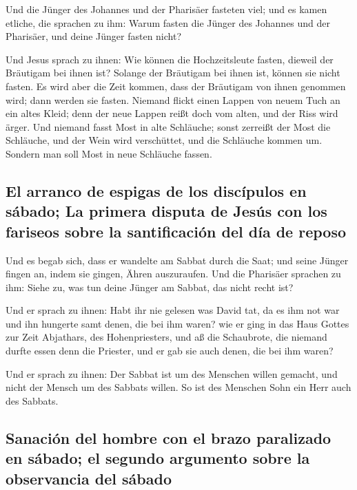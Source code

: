  Und die Jünger des Johannes und der Pharisäer fasteten
viel; und es kamen etliche, die sprachen zu ihm: Warum fasten die Jünger
des Johannes und der Pharisäer, und deine Jünger fasten nicht?

 Und Jesus sprach zu ihnen: Wie können die Hochzeitsleute
fasten, dieweil der Bräutigam bei ihnen ist? Solange der Bräutigam bei
ihnen ist, können sie nicht fasten.  Es wird aber die
Zeit kommen, dass der Bräutigam von ihnen genommen wird; dann werden sie
fasten.  Niemand flickt einen Lappen von neuem Tuch an
ein altes Kleid; denn der neue Lappen reißt doch vom alten, und der Riss
wird ärger.  Und niemand fasst Most in alte Schläuche;
sonst zerreißt der Most die Schläuche, und der Wein wird verschüttet,
und die Schläuche kommen um. Sondern man soll Most in neue Schläuche
fassen.

\hypertarget{el-arranco-de-espigas-de-los-discuxedpulos-en-suxe1bado-la-primera-disputa-de-jesuxfas-con-los-fariseos-sobre-la-santificaciuxf3n-del-duxeda-de-reposo}{%
\subsection{El arranco de espigas de los discípulos en sábado; La
primera disputa de Jesús con los fariseos sobre la santificación del día
de
reposo}\label{el-arranco-de-espigas-de-los-discuxedpulos-en-suxe1bado-la-primera-disputa-de-jesuxfas-con-los-fariseos-sobre-la-santificaciuxf3n-del-duxeda-de-reposo}}

 Und es begab sich, dass er wandelte am Sabbat durch die
Saat; und seine Jünger fingen an, indem sie gingen, Ähren auszuraufen.
 Und die Pharisäer sprachen zu ihm: Siehe zu, was tun
deine Jünger am Sabbat, das nicht recht ist?

 Und er sprach zu ihnen: Habt ihr nie gelesen was David
tat, da es ihm not war und ihn hungerte samt denen, die bei ihm waren?
 wie er ging in das Haus Gottes zur Zeit Abjathars, des
Hohenpriesters, und aß die Schaubrote, die niemand durfte essen denn die
Priester, und er gab sie auch denen, die bei ihm waren?

 Und er sprach zu ihnen: Der Sabbat ist um des Menschen
willen gemacht, und nicht der Mensch um des Sabbats willen.
 So ist des Menschen Sohn ein Herr auch des Sabbats.

\hypertarget{sanaciuxf3n-del-hombre-con-el-brazo-paralizado-en-suxe1bado-el-segundo-argumento-sobre-la-observancia-del-suxe1bado}{%
\subsection{Sanación del hombre con el brazo paralizado en sábado; el
segundo argumento sobre la observancia del
sábado}\label{sanaciuxf3n-del-hombre-con-el-brazo-paralizado-en-suxe1bado-el-segundo-argumento-sobre-la-observancia-del-suxe1bado}}

